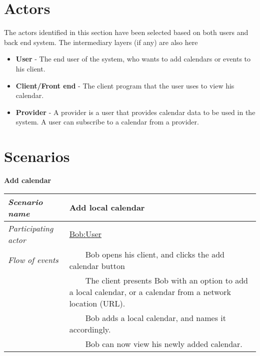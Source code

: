 \documentclass[10pt]{report}
\newcommand{\tabitem}{~~\llap{\textbullet}~~}
\numberwithin{equation}{section} %
\numberwithin{figure}{section} %
\numberwithin{table}{section} %
\begin{document}
\section{Actors}
The actors identified in this section have been selected based on both users and
back end system. The intermediary layers (if any) are also here
\begin{itemize}
\item \textbf{User} - The end user of the system, who wants to add calendars or
  events to his client.
\item \textbf{Client/Front end} - The client program that the user uses to view
  his calendar.
\item \textbf{Provider} - A provider is a user that provides calendar data to be
  used in the system. A user can subscribe to a calendar from a provider.
\end{itemize}

\section{Scenarios}
\begin{table}[H]
\noindent \textbf{Add calendar}\\
\begin{tabularx}{\textwidth}{l X}
\midrule
\textit{Scenario name} & Add local calendar \\ \midrule
\textit{Participating actor} & \underline{Bob:User} \\ \midrule
\textit{Flow of events} & \tabitem Bob opens his client, and clicks the add
                                       calendar button \\
                                       & \tabitem The client presents Bob with
                                       an option to add a local calendar, or a
                                       calendar from a network location (URL). \\
                                       & \tabitem Bob adds a local calendar, and
                                       names it accordingly. \\
                                       & \tabitem Bob can now view his newly
                                       added calendar. \\
                                       \midrule
\end{tabularx}
\end{table}
\end{document}
